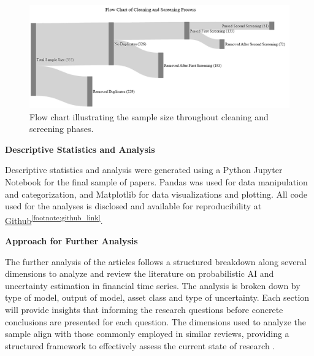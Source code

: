   \begin{figure}[h]
      \centering
      \includegraphics[width=1\linewidth]{Images/screening_funnel.png}
      \caption{Flow chart illustrating the sample size throughout cleaning and screening phases.}
      \label{fig:screening_and_cleaning_funnel}
  \end{figure}


\textbf{Descriptive Statistics and Analysis}\nopagebreak

Descriptive statistics and analysis were generated using a Python Jupyter Notebook for the final sample of papers. Pandas was used for data manipulation and categorization, and Matplotlib for data visualizations and plotting. All code used for the analyses is disclosed and available for reproducibility at \hyperlink{https://github.com/tjespe/literature-review/}{Github}\textsuperscript{\ref{footnote:github_link}}.

\textbf{Approach for Further Analysis}\nopagebreak

The further analysis of the articles follows a structured breakdown along several dimensions to analyze and review the literature on probabilistic AI and uncertainty estimation in financial time series. The analysis is broken down by type of model, output of model, asset class and type of uncertainty. Each section will provide insights that informing the research questions before concrete conclusions are presented for each question. The dimensions used to analyze the sample align with those commonly employed in similar reviews, providing a structured framework to effectively assess the current state of research \parencite{Blasco_et_al_2024}.

